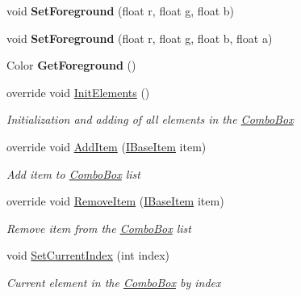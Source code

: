 \begin{DoxyCompactItemize}
\item 
\mbox{\label{class_space_v_i_l_1_1_combo_box_a7ed276a6c360cf4c591431d36c2a7542}} 
void {\bfseries Set\+Foreground} (float r, float g, float b)
\item 
\mbox{\label{class_space_v_i_l_1_1_combo_box_aad44c849af0f9bb7c4861e800660d355}} 
void {\bfseries Set\+Foreground} (float r, float g, float b, float a)
\item 
\mbox{\label{class_space_v_i_l_1_1_combo_box_a3fefa5ed1de819e0c22b550ad8f9692f}} 
Color {\bfseries Get\+Foreground} ()
\item 
override void \mbox{\hyperlink{class_space_v_i_l_1_1_combo_box_af43d1181237882f92c25cf60cb67233a}{Init\+Elements}} ()
\begin{DoxyCompactList}\small\item\em Initialization and adding of all elements in the \mbox{\hyperlink{class_space_v_i_l_1_1_combo_box}{Combo\+Box}} \end{DoxyCompactList}\item 
override void \mbox{\hyperlink{class_space_v_i_l_1_1_combo_box_a05b737bc6384aa858fe63ffe5cc03afd}{Add\+Item}} (\mbox{\hyperlink{interface_space_v_i_l_1_1_core_1_1_i_base_item}{I\+Base\+Item}} item)
\begin{DoxyCompactList}\small\item\em Add item to \mbox{\hyperlink{class_space_v_i_l_1_1_combo_box}{Combo\+Box}} list \end{DoxyCompactList}\item 
override void \mbox{\hyperlink{class_space_v_i_l_1_1_combo_box_a646108f1b822d481ae32b68e7bd3f44f}{Remove\+Item}} (\mbox{\hyperlink{interface_space_v_i_l_1_1_core_1_1_i_base_item}{I\+Base\+Item}} item)
\begin{DoxyCompactList}\small\item\em Remove item from the \mbox{\hyperlink{class_space_v_i_l_1_1_combo_box}{Combo\+Box}} list \end{DoxyCompactList}\item 
void \mbox{\hyperlink{class_space_v_i_l_1_1_combo_box_a9e06cbc4b358a4e145284ed396da159b}{Set\+Current\+Index}} (int index)
\begin{DoxyCompactList}\small\item\em Current element in the \mbox{\hyperlink{class_space_v_i_l_1_1_combo_box}{Combo\+Box}} by index \end{DoxyCompactList}\item 

\end{DoxyCompactItemize}
